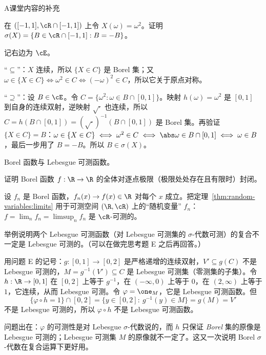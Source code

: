 \begin{exercises}{A}{课堂内容的补充}
\item\label{ex:random-variables:A6} 在 $([-1,1],\cR\cap[-1,1])$ 上令 $X(\omega)=\omega^2$。证明 $\sigma(X)=\{B\in\cR\cap[-1,1]: B=-B\}$。
\begin{solution}
记右边为 $\cE$。

“$\subseteq$”：$X$ 连续，所以 $\{X\in C\}$ 是 Borel 集；又 $\omega\in\{X\in C\}\iff\omega^2\in C\iff(-\omega)^2\in C$，所以它关于原点对称。

“$\supseteq$”：设 $B\in\cE$。令 $C=\{\omega^2:\omega\in B\cap[0,1]\}$。映射 $h(\omega)=\omega^2$ 是 $[0,1]$ 到自身的连续双射，逆映射 $\sqrt{\cdot}$ 也连续，所以 $C=h(B\cap[0,1])=(\sqrt{\cdot})^{-1}(B\cap[0,1])$ 是 Borel 集。再验证 $\{X\in C\}=B$：$\omega\in\{X\in C\}\iff\omega^2\in C\iff\abs\omega\in B\cap[0,1]\iff\omega\in B$，最后一步用了 $B=-B$。所以 $B\in\sigma(X)$。
\end{solution}

\item\label{ex:random-variables:A7} Borel 函数与 Lebesgue 可测函数。
\begin{questions}
\item 证明 Borel 函数 $f:\R\to\R$ 的全体对逐点极限（极限处处存在且有限时）封闭。
\begin{solution}
设 $f_n$ 是 Borel 函数，$f_n(x)\to f(x)\in\R$ 对每个 $x$ 成立。把定理~\ref{thm:random-variables:limits} 用于可测空间 $(\R,\cR)$ 上的“随机变量” $f_n$：$f=\lim_nf_n=\limsup_nf_n$ 是 $\cR$-可测的。
\end{solution}
\item 举例说明两个 Lebesgue 可测函数（对 Lebesgue 可测集的 $\sigma$-代数可测）的复合不一定是 Lebesgue 可测的。（可以在做完思考题 E 之后再回答。）
\begin{solution}
用问题 E 的记号：$g:[0,1]\to[0,2]$ 是严格递增的连续双射，$V'\subseteq g(C)$ 不是 Lebesgue 可测的，$M=g^{-1}(V')\subseteq C$ 是 Lebesgue 可测集（零测集的子集）。令 $h:\R\to[0,1]$ 在 $[0,2]$ 上等于 $g^{-1}$，在 $(-\infty,0)$ 上等于 $0$，在 $(2,\infty)$ 上等于 $1$，它连续，从而 Lebesgue 可测。令 $\varphi=\one_M$，它是 Lebesgue 可测函数。但
\[
\{\varphi\circ h=1\}\cap[0,2]=\{y\in[0,2]:\ g^{-1}(y)\in M\}=g(M)=V'
\]
不是 Lebesgue 可测的，所以 $\varphi\circ h$ 不是 Lebesgue 可测函数。

问题出在：$\varphi$ 的可测性是对 Lebesgue $\sigma$-代数说的，而 $h$ 只保证 \emph{Borel} 集的原像是 Lebesgue 可测的；Lebesgue 可测集 $M$ 的原像就不一定了。这又一次说明 Borel $\sigma$-代数在复合运算下更好用。
\end{solution}
\end{questions}


\end{exercises}
